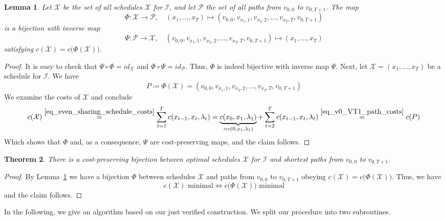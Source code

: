 \documentclass[hidelinks]{article}
\theoremstyle{plain}
\newtheorem{thm}{Theorem}[section]
\newtheorem{lem}[thm]{Lemma}
\theoremstyle{definition}
\theoremstyle{rem}
\newcommand{\mx}{\mathcal{X}}
\newcommand{\inp}{\mathcal{I}}
\newcommand{\costs}{c}
\begin{document}
\begin{lem}\label{lem_sched_path_pseudo_poly}
Let $\bm{\mx}$ be the set of all schedules $\mx$ for $\inp$, and let $\bm{\mathcal{P}}$ the set of all paths from $v_{0,0}$ to $v_{0,T+1}$. The map
\begin{equation*}
	\Phi:\bm{\mx}\rightarrow\bm{\mathcal{P}},\quad(x_1,\ldots,x_T)\mapsto (v_{0,0},v_{x_1,1},v_{x_2,2},\ldots,v_{x_T,T},v_{0,T+1})
\end{equation*}
is a bijection with inverse map
\begin{equation*}
	\Psi:\bm{\mathcal{P}}\rightarrow\bm{\mx},\quad (v_{0,0},v_{x_1,1},v_{x_2,2},\ldots,v_{x_T,T},v_{0,T+1})\mapsto (x_1,\ldots,x_T)
\end{equation*}
satisfying $\costs(\mx)=\costs\bigl(\Phi(\mx)\bigr)$.
\end{lem}
\begin{proof}
It is easy to check that $\Psi\circ\Phi=id_{\bm{\mathcal{\mx}}}$ and $\Phi\circ\Psi=id_{\bm{\mathcal{P}}}$. Thus, $\Phi$ is indeed bijective with inverse map $\Psi$. Next, let $\mx=(x_1,\ldots,x_T)$ be a schedule for $\inp$. We have
\begin{equation*}
	P\coloneqq\Phi(\mx)=(v_{0,0},v_{x_1,1},v_{x_2,2},\ldots,v_{x_T,T},v_{0,T+1})
\end{equation*}
We examine the costs of $\mx$ and conclude
\begin{equation*}
\costs(\mx)\stackrel{\eqref{eq_even_sharing_schedule_costs}}{=}\sum\limits_{t=1}^{T}\costs(x_{t-1},x_{t},\lambda_t)=\underbrace{\costs(x_0,x_1,\lambda_1)}_{=\costs(0,x_1,\lambda_1)}+\sum\limits_{t=2}^{T}\costs(x_{t-1},x_{t},\lambda_t)\stackrel{\eqref{eq_v0_VT1_path_costs}}{=}\costs(P)
\end{equation*}
Which shows that $\Phi$ and, as a consequence, $\Psi$ are cost-preserving maps, and the claim follows.
\end{proof}
\begin{thm}
There is a cost-preserving bijection between optimal schedules $\mx$ for $\inp$ and shortest paths from $v_{0,0}$ to $v_{0,T+1}$.
\end{thm} 
\begin{proof}
By Lemma~\ref{lem_sched_path_pseudo_poly} we have a bijection $\Phi$ between schedules $\mx$ and paths from $v_{0,0}$ to $v_{0,T+1}$ obeying $\costs(\mx)=\costs\bigl(\Phi(\mx)\bigr)$. Thus, we have 
\begin{equation*}
	\costs(\mx)\text{ minimal}\iff \costs\bigl(\Phi(\mx)\big)\text{ minimal}
\end{equation*}
and the claim follows.
\end{proof}
In the following, we give an algorithm based on our just verified construction. 
We split our procedure into two subroutines. 
\end{document}
